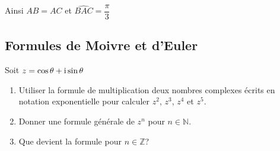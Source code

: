  
 \medskip
 
 Ainsi $ AB=AC $  et $ \widehat{BAC}=\dfrac{\pi}{3} $
\subsection*{ Formules de Moivre et d'Euler}
\begin{lemma}
Soit $ z=\cos \theta +\text{i} \sin \theta $
\begin{enumerate}
\item Utiliser la formule de multiplication deux nombres complexes écrits en notation exponentielle pour calculer $ z^2 $, $ z^3 $, $ z^4 $ et  $ z^5 $.
\item Donner une formule générale de $ z^n $ pour $ n\in\mathbb{N} $.
\item Que devient la  formule   pour $ n\in\mathbb{Z} $? 
\end{enumerate}
\end{lemma}

